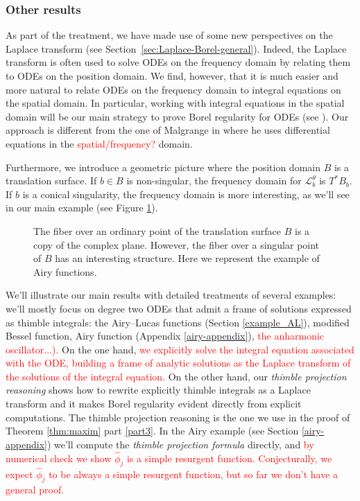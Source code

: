 \documentclass{article}
\theoremstyle{definition}
\newcommand{\laplace}{\mathcal{L}}
\begin{document}
\subsubsection{Other results}

As part of the treatment, we have made use of some new perspectives on the Laplace transform (see Section~\ref{sec:Laplace-Borel-general}). Indeed, the Laplace transform is often used to solve ODEs on the frequency domain by relating them to ODEs on the position domain. We find, however, that it is much easier and more natural to relate ODEs on the frequency domain to integral equations on the spatial domain. In particular, working with integral equations in the spatial domain will be our main strategy to prove Borel regularity for ODEs (see \cite[Theorem 4]{reg-sing-volterra}). Our approach is different from the one of Malgrange in \cite{malgrange--fourier} where he uses differential equations in the \textcolor{red}{spatial/frequency?} domain. 

Furthermore, we introduce a geometric picture where the position domain $B$ is a translation surface. If $b \in B$ is non-singular, the frequency domain for $\laplace_b^\theta$ is $T^* B_b$. If $b$ is a conical singularity, the frequency domain is more interesting, as we'll see in our main example (see Figure \ref{fig:different_fibres}). 


\begin{figure}[h]
    \centering
    \caption{The fiber over an ordinary point of the translation surface $B$ is a copy of the complex plane. However, the fiber over a singular point of $B$ has an interesting structure. Here we represent the example of Airy functions.}
    \label{fig:different_fibres}
\end{figure}
We’ll illustrate our main results with detailed treatments of several examples: we’ll mostly focus on degree two ODEs that admit a frame of solutions expressed as thimble integrals: the Airy--Lucas functions (Section \ref{example_AL}), modified Bessel function, Airy function (Appendix \ref{airy-appendix}), \textcolor{red}{the anharmonic oscillator...).} On the one hand, \textcolor{red}{we explicitly solve the integral equation associated with the ODE, building a frame of analytic solutions as the Laplace transform of the solutions of the integral equation.} On the other hand, our \textit{thimble projection reasoning} shows how to rewrite explicitly thimble integrals as a Laplace transform and it makes Borel regularity evident directly from explicit computations. The thimble projection reasoning is the one we use in the proof of Theorem \ref{thm:maxim} part \ref{part3}. In the Airy example (see Section \ref{airy-appendix}) we’ll compute the \textit{thimble projection formula} directly, and \textcolor{red}{by numerical check we show $\hat{\phi}_j$ is a simple resurgent function. Conjecturally, we expect $\hat{\phi}_j$ to be always a simple resurgent function, but so far we don't have a general proof.}
\end{document}
